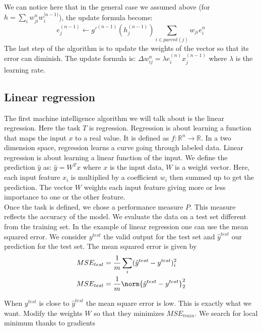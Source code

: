 	We can notice here that in the general case we assumed above (for $h = \sum_i w_{ji}^n w_i^{[n-1)}$), the update formula become: 
	\begin{equation}
		e_j^{(n-1)} \leftarrow g'^{(n-1)}(h_j^{(n-1)}) \sum_{i\in parent(j)} w_{ji} e_i^{n}
	\end{equation}
	The last step of the algorithm is to update the weights of the vector so that its error can diminish. The update formula is: $\Delta w_{ij}^n = \lambda e_i^{(n)} x_j^{(n-1)}$ where $\lambda$ is the learning rate.



	\subsection{Linear regression}
		The first machine intelligence algorithm we will talk about is the linear regression. Here the task $T$ is regression. Regression  is about learning a function that maps the input $x$ to a real value. It is defined as $f:\mathbb{R}^n \rightarrow \mathbb{R}$. In a two dimension space, regression learns a curve going through labeled data.
		Linear regression is about learning  a linear function of the input. We define the prediction $\hat{y}$ as: $\hat{y}=W^Tx$ where $x$ is the input data, $W$ is a weight vector. Here, each input feature $x_i$ is multiplied by a coefficient $w_i$ then summed up to get the prediction. The vector $W$ weights each input feature giving more or less importance to one or the other feature.\\


		Once the task is defined, we chose a performance measure $P$. This measure reflects the accuracy of the model. We evaluate the data on a test set different from the training set. 
		In the example of linear regression one can use the mean squared error. We consider $y^{test}$ the valid output for the test set and $\hat{y}^{test}$ our prediction for the test set. The mean squared error is given by
		\begin{equation}
			\begin{split}
				MSE_{test} &= \frac{1}{m}\sum_{i}(\hat{y}^{test}	- y^{test})_i^2 \\
				MSE_{test} &= \frac{1}{m}   \norm{\hat{y}^{test}	- y^{test}}_2^2
			\end{split}
		\end{equation}

		When $y^{test}$ is close to $\hat{y}^{test}$ the mean square error is low. This is exactly what we want. Modify the weights $W$ so that they minimizes $MSE_{train}$. We search for local minimum thanks to gradients

